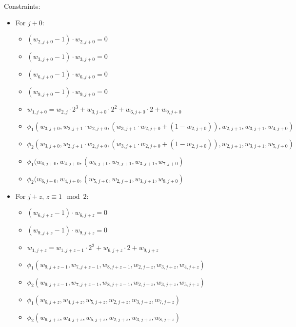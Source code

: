 Constraints:
\begin{itemize}
    \item For $j + 0$:
        \begin{itemize}
        	 \item $(w_{2, j + 0} - 1) \cdot w_{2, j + 0} = 0$ 
        	 \item $(w_{3, j + 0} - 1) \cdot w_{3, j + 0} = 0$
        	 \item $(w_{6, j + 0} - 1) \cdot w_{6, j + 0} = 0$ 
        	 \item $(w_{9, j + 0} - 1) \cdot w_{9, j + 0} = 0$ 
            \item $w_{1, j + 0} = w_{2, j} \cdot 2^3 + w_{3, j + 0} \cdot 2^2 + w_{6, j + 0} \cdot 2 + w_{9, j + 0}$
            \item $\phi_1(w_{3, j + 0}, w_{2, j + 1} \cdot w_{2, j + 0}, (w_{3, j + 1} \cdot w_{2, j + 0} + (1 - w_{2, j + 0})), w_{2, j + 1}, w_{3, j + 1}, w_{4, j + 0})$
            \item $\phi_2(w_{3, j + 0}, w_{2, j + 1} \cdot w_{2, j + 0}, (w_{3, j + 1} \cdot w_{2, j + 0} + (1 - w_{2, j + 0})), w_{2, j + 1}, w_{3, j + 1}, w_{5, j + 0})$
            \item $\phi_1(w_{6, j + 0}, w_{4, j + 0}, (w_{5, j + 0}, w_{2, j + 1}, w_{3, j + 1}, w_{7, j + 0})$
            \item $\phi_2(w_{6, j + 0}, w_{4, j + 0}, (w_{5, j + 0}, w_{2, j + 1}, w_{3, j + 1}, w_{8, j + 0})$
        \end{itemize}
    \item For $j + z$, $z \equiv 1 \mod 2$:
        \begin{itemize}
        	 \item $(w_{6, j + z} - 1) \cdot w_{6, j + z} = 0$
        	 \item $(w_{9, j + z} - 1) \cdot w_{9, j + z} = 0$
            \item $w_{1, j + z} = w_{1, j + z - 1} \cdot 2^2 + w_{6, j + z} \cdot 2 + w_{9, j + z}$
            \item $\phi_1(w_{9, j + z - 1}, w_{7, j + z - 1}, w_{8, j + z - 1}, w_{2, j + z}, w_{3, j + z}, w_{4, j + z})$
            \item $\phi_2(w_{9, j + z - 1}, w_{7, j + z - 1}, w_{8, j + z - 1}, w_{2, j + z}, w_{3, j + z}, w_{5, j + z})$
            \item $\phi_1(w_{6, j + z}, w_{4, j + z}, w_{5, j + z}, w_{2, j + z}, w_{3, j + z}, w_{7, j + z})$
            \item $\phi_2(w_{6, j + z}, w_{4, j + z}, w_{5, j + z}, w_{2, j + z}, w_{3, j + z}, w_{8, j + z})$         

\end{itemize}
\end{itemize}
